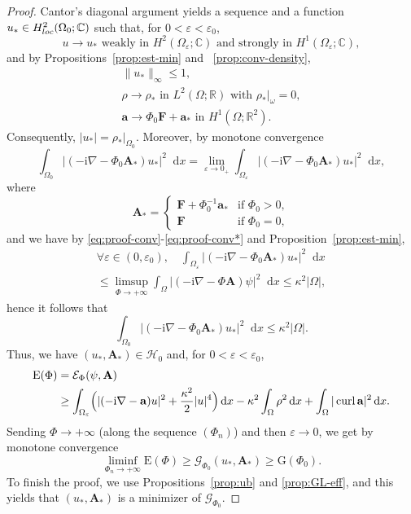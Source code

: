 \documentclass[11pt]{amsart}
\DeclareMathOperator{\curl}{curl}
\newcommand{\R}{\mathbb R}
\newcommand{\C}{\mathbb C}
\newcommand{\Ab}{\mathbf A}
\newcommand{\Fb}{\mathbf F}
\newcommand{\ab}{\mathbf a}
\newcommand{\dd}{\mathop{}\!{\mathrm d}}
\newcommand{\ii}{\mathrm i}
\newcommand{\Ef}{\mathcal E_\Phi}
\newcommand{\En}{\mathrm E(\Phi)}
\newcommand{\cG}{\mathcal G}
\newcommand{\rG}{\mathrm G}
\newcommand{\cH}{\mathcal H}
\theoremstyle{definition}
\numberwithin{equation}{section}
\begin{document}
\begin{proof}
Cantor's diagonal argument yields a sequence  and a  function $u_*\in H^2_{\rm loc}(\Omega_0;\C)$ such that,  for $0<\varepsilon<\varepsilon_0$,
\begin{equation}\label{eq:proof-conv}
 u\to u_*\text{ weakly in }H^2(\Omega_\varepsilon;\C) \mbox{ and strongly in }H^1(\Omega_\varepsilon;\C),\end{equation}
and by Propositions~\ref{prop:est-min} and ~\ref{prop:conv-density},
\begin{equation}\label{eq:proof-conv*}
\begin{gathered}
\|u_*\|_\infty\leq 1,\\
\rho\to \rho_*\text{ in }L^2(\Omega;\R)\text{ with }\rho_*|_{\omega}=0,\\
\ab\to \Phi_0\Fb+\ab_*\text{ in }H^1(\Omega;\R^2).
\end{gathered}
\end{equation}
Consequently,  $|u_*|=\rho_*|_{\Omega_0}$.  Moreover, by monotone convergence
\[\int_{\Omega_0}|(-\ii\nabla-\Phi_0\Ab_*)u_*|^2\dd x=\lim_{\varepsilon\to0_+}\int_{\Omega_\varepsilon}|(-\ii\nabla-\Phi_0\Ab_*)u_*|^2\dd x, \]
where
\[\Ab_*=\begin{cases}\Fb+\Phi_0^{-1}\ab_*&\text{if }\Phi_0>0,\\
\Fb&\text{if }\Phi_0=0,\end{cases}\]
and we have by \eqref{eq:proof-conv}-\eqref{eq:proof-conv*} and Proposition~\ref{prop:est-min},
\begin{multline*}\forall\varepsilon\in(0,\varepsilon_0),\quad \int_{\Omega_\varepsilon}|(-\ii\nabla-\Phi_0\Ab_*)u_*|^2\dd x\\
\leq \limsup_{\Phi\to+\infty}\int_{\Omega}|(-\ii\nabla-\Phi\Ab)\psi|^2\dd x\leq \kappa^2|\Omega|,\end{multline*}
hence it follows that
\[\int_{\Omega_0}|(-\ii\nabla-\Phi_0\Ab_*)u_*|^2\dd x \leq \kappa^2|\Omega|.\]
 Thus, we have $(u_*,\Ab_*)\in\cH_0$ and, for $0<\varepsilon<\varepsilon_0$,
\[\begin{aligned}
\En&=\Ef(\psi,\Ab)\\
&\geq \int_{\Omega_\varepsilon}\Bigl(|(-\ii\nabla-\ab)u|^2+\frac{\kappa^2}2|u|^4\Bigr)\dd x-\kappa^2\int_{\Omega}\rho^2\dd x+\int_\Omega|\curl\ab|^2\dd x .
\end{aligned}\]
Sending $\Phi\to+\infty$ (along the sequence $(\Phi_n)$) and then $\varepsilon\to0$, we get by monotone convergence
\[\liminf_{\Phi_n\to+\infty}\En\geq \cG_{\Phi_0}(u_*,\Ab_*)\geq \rG(\Phi_0).\]
To finish the proof, we use Propositions~\ref{prop:ub} and \ref{prop:GL-eff}, and this yields that $(u_*,\Ab_*)$ is a minimizer of $\cG_{\Phi_0}$.
\end{proof}
\end{document}
